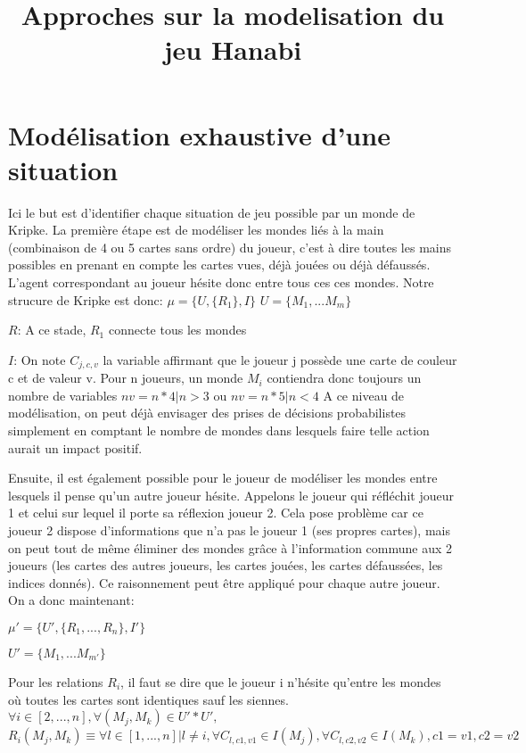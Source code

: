 \documentclass{article}
\title{Approches sur la modelisation du jeu Hanabi}
\date{}
\begin{document}
\maketitle

\section{Modélisation exhaustive d'une situation}


    Ici le but est d'identifier chaque situation de jeu possible par un monde de Kripke.
La première étape est de modéliser les mondes liés à la main (combinaison de 4 ou 5 cartes sans
ordre) du joueur, c'est à dire toutes les mains possibles en prenant en compte les cartes vues, déjà jouées ou déjà défaussés. L'agent correspondant au joueur hésite donc entre tous ces ces mondes.
Notre strucure de Kripke est donc:
\smallbreak
$   \mu=\{U,\{R_{1}\},I \}  $
$   U=\{M_{1},...M_{m} \}   $

$R$: A ce stade, $R_{1}$ connecte tous les mondes

$I$: On note    $C_{j,c,v}$ la variable affirmant que le joueur j possède une carte de couleur c et de valeur v. Pour n joueurs, un monde $M_{i}$ contiendra donc toujours un nombre de variables $nv=n*4 | n>3$ ou $nv=n*5 | n<4$
\smallbreak
A ce niveau de modélisation, on peut déjà envisager des prises de décisions probabilistes simplement en comptant le nombre de mondes dans lesquels faire telle action aurait un impact positif.

Ensuite, il est également possible pour le joueur de modéliser les mondes entre lesquels il pense qu'un autre joueur hésite. Appelons le joueur qui réfléchit joueur 1 et celui sur lequel il porte sa
réflexion joueur 2. Cela pose problème car ce joueur 2 dispose d'informations que n'a pas le joueur 1 (ses propres cartes), mais on peut tout de même éliminer des mondes grâce à l'information
commune aux 2 joueurs (les cartes des autres joueurs, les cartes jouées, les cartes défaussées, les indices donnés). Ce raisonnement peut être appliqué pour chaque autre joueur.
On a donc maintenant:

$   \mu'=\{U',\{R_{1},...,R_{n}\},I' \} $

$   U'=\{M_{1},...M_{m'} \} $


Pour les relations $R_{i}$, il faut se dire que le joueur i n'hésite qu'entre les mondes où toutes les cartes sont identiques sauf les siennes.
\smallbreak
$   \forall i \in [2,...,n] ,  \forall (M_{j},M_{k}) \in U'*U',$
\smallbreak
$R_{i}(M_{j},M_{k}) 
\equiv
\forall l \in [1,...,n]|l \ne i,  \forall C_{l,c1,v1} \in  I(M_{j}), \forall C_{l,c2,v2} \in  I(M_{k}), c1=v1, c2=v2    $
\newpage
\end{document}
